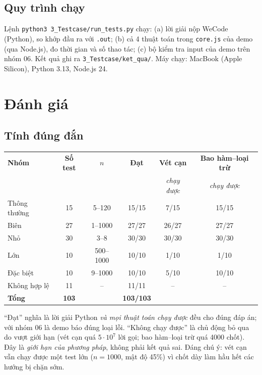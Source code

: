 \documentclass[12pt,a4paper]{report}
\begin{document}
\section{Quy trình chạy}
Lệnh \texttt{python3 3\_Testcase/run\_tests.py} chạy: (a) lời giải nộp WeCode (Python), so khớp đầu ra với \texttt{.out}; (b) cả 4 thuật toán trong \texttt{core.js} của demo (qua Node.js), đo thời gian và số thao tác; (c) bộ kiểm tra input của demo trên nhóm 06. Kết quả ghi ra \texttt{3\_Testcase/ket\_qua/}. Máy chạy: MacBook (Apple Silicon), Python 3.13, Node.js 24.

\chapter{Đánh giá}
\section{Tính đúng đắn}
\begin{center}
\begin{tabular}{lccccc}
\toprule
\textbf{Nhóm} & \textbf{Số test} & \textbf{$n$} & \textbf{Đạt} & \textbf{Vét cạn} & \textbf{Bao hàm--loại trừ}\\
 & & & & \textit{chạy được} & \textit{chạy được}\\\midrule
Thông thường & 15 & 5--120 & 15/15 & 7/15 & 15/15\\
Biên & 27 & 1--1000 & 27/27 & 26/27 & 27/27\\
Nhỏ & 30 & 3--8 & 30/30 & 30/30 & 30/30\\
Lớn & 10 & 500--1000 & 10/10 & 1/10 & 1/10\\
Đặc biệt & 10 & 9--1000 & 10/10 & 5/10 & 10/10\\
Không hợp lệ & 11 & -- & 11/11 & -- & --\\\midrule
\textbf{Tổng} & \textbf{103} & & \textbf{103/103} & & \\
\bottomrule
\end{tabular}
\end{center}
``Đạt'' nghĩa là lời giải Python \emph{và mọi thuật toán chạy được} đều cho đúng đáp án; với nhóm 06 là demo báo đúng loại lỗi. ``Không chạy được'' là chủ động bỏ qua do vượt giới hạn (vét cạn quá $5\cdot10^7$ lời gọi; bao hàm--loại trừ quá 4000 chốt). Đây là \emph{giới hạn của phương pháp}, không phải kết quả sai. Đáng chú ý: vét cạn vẫn chạy được một test lớn ($n=1000$, mật độ 45\%) vì chốt dày làm hầu hết các hướng bị chặn sớm.
\end{document}
